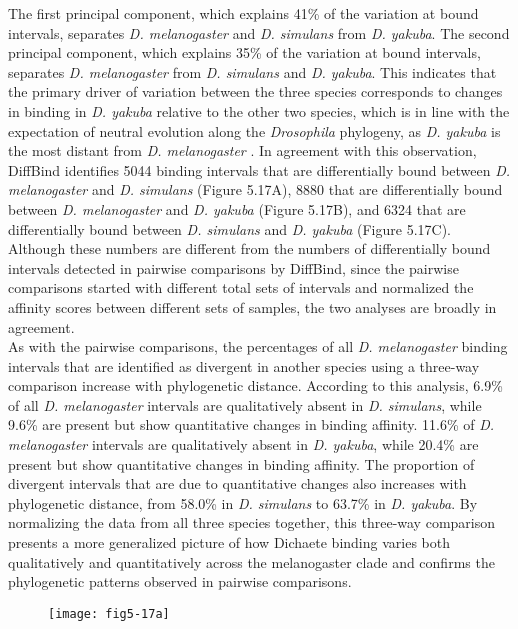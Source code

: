 The first principal component, which explains 41\% of the variation at bound intervals, separates \emph{D. melanogaster} and \emph{D. simulans} from \emph{D. yakuba}. The second principal component, which explains 35\% of the variation at bound intervals, separates \emph{D. melanogaster} from \emph{D. simulans} and \emph{D. yakuba}. This indicates that the primary driver of variation between the three species corresponds to changes in binding in \emph{D. yakuba} relative to the other two species, which is in line with the expectation of neutral evolution along the \emph{Drosophila} phylogeny, as \emph{D. yakuba} is the most distant from \emph{D. melanogaster} \citep{russo_molecular_1995}. In agreement with this observation, DiffBind identifies 5044 binding intervals that are differentially bound between \emph{D. melanogaster} and \emph{D. simulans} (Figure 5.17A), 8880 that are differentially bound between \emph{D. melanogaster} and \emph{D. yakuba} (Figure 5.17B), and 6324 that are differentially bound between \emph{D. simulans} and \emph{D. yakuba} (Figure 5.17C). Although these numbers are different from the numbers of differentially bound intervals detected in pairwise comparisons by DiffBind, since the pairwise comparisons started with different total sets of intervals and normalized the affinity scores between different sets of samples, the two analyses are broadly in agreement.\\

As with the pairwise comparisons, the percentages of all \emph{D. melanogaster} binding intervals that are identified as divergent in another species using a three-way comparison increase with phylogenetic distance. According to this analysis, 6.9\% of all \emph{D. melanogaster} intervals are qualitatively absent in \emph{D. simulans}, while 9.6\% are present but show quantitative changes in binding affinity. 11.6\% of \emph{D. melanogaster} intervals are qualitatively absent in \emph{D. yakuba}, while 20.4\% are present but show quantitative changes in binding affinity. The proportion of divergent intervals that are due to quantitative changes also increases with phylogenetic distance, from 58.0\% in \emph{D. simulans} to 63.7\% in \emph{D. yakuba}. By normalizing the data from all three species together, this three-way comparison presents a more generalized picture of how Dichaete binding varies both qualitatively and quantitatively across the melanogaster clade and confirms the phylogenetic patterns observed in pairwise comparisons.


\begin{figure}[H]
\centering
\texttt{[image: fig5-17a]}
\label{Figure 5.17}
\end{figure}

